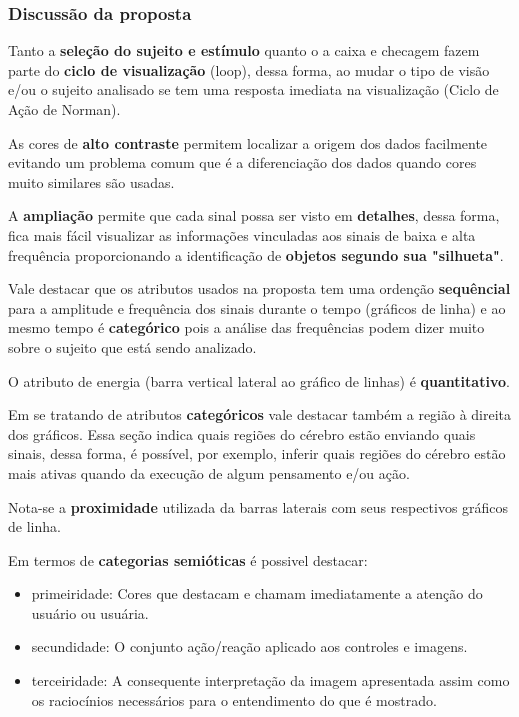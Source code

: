 \begin{frame}[allowframebreaks]
	\frametitle{Discussão da proposta}
	\par Tanto a \textbf{seleção do sujeito e estímulo} quanto o a caixa e checagem fazem parte do \textbf{ciclo de visualização} (loop), dessa forma, ao mudar o tipo de visão e/ou o sujeito analisado se tem uma resposta imediata na visualização (Ciclo de Ação de Norman).\newline
	
	\par As cores de \textbf{alto contraste} permitem localizar a origem dos dados facilmente evitando um problema comum que é a diferenciação dos dados quando cores muito similares são usadas.\newline
	
	\par A \textbf{ampliação} permite que cada sinal possa ser visto em \textbf{detalhes}, dessa forma, fica mais fácil visualizar as informações vinculadas aos sinais de baixa e alta frequência proporcionando a identificação de \textbf{objetos segundo sua "silhueta"}.\newline
	
	\par Vale destacar que os atributos usados na proposta tem uma ordenção \textbf{sequêncial} para a amplitude e frequência dos sinais durante o tempo (gráficos de linha) e ao mesmo tempo é \textbf{categórico} pois a análise das frequências podem dizer muito sobre o sujeito que está sendo analizado.\newline
	\par O atributo de energia (barra vertical lateral ao gráfico de linhas) é \textbf{quantitativo}.\newline
	
	\par Em se tratando de atributos \textbf{categóricos} vale destacar também a região à direita dos gráficos. Essa seção indica quais regiões do cérebro estão enviando quais sinais, dessa forma, é possível, por exemplo, inferir quais regiões do cérebro estão mais ativas quando da execução de algum pensamento e/ou ação.\newline
	
	\par Nota-se a \textbf{proximidade} utilizada da barras laterais com seus respectivos gráficos de linha.\newline
	
	\par Em termos de \textbf{categorias semióticas} \cite{santaella2017semiotica} é possivel destacar:
	\begin{itemize}
		\item primeiridade: Cores que destacam e chamam imediatamente a atenção do usuário ou usuária.
		\item secundidade: O conjunto ação/reação aplicado aos controles e imagens.
		\item terceiridade: A consequente interpretação da imagem apresentada assim como os raciocínios necessários para o entendimento do que é mostrado.
	\end{itemize}

\end{frame}